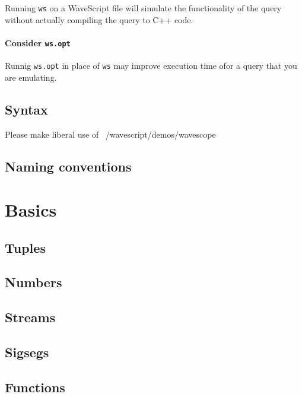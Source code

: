 Running {\tt ws} on a WaveScript file will simulate the functionality
of the query without actually compiling the query to C++ code.

\subsubsection*{Consider {\tt ws.opt}}

Runnig {\tt ws.opt} in place of {\tt ws} may improve execution time
ofor a query that you are emulating.


\section{Syntax}

Please make liberal use of ~/wavescript/demos/wavescope

\section{Naming conventions}


\chapter{Basics}

\section{Tuples}

\section{Numbers}



\section{Streams}

\section{Sigsegs}

\section{Functions}

